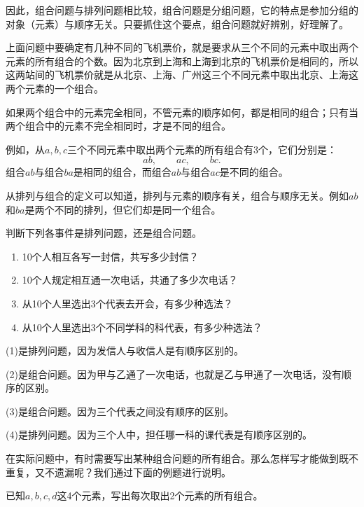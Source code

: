 因此，组合问题与排列问题相比较，组合问题是分组问题，它的特点是参加分组的对象（元素）与顺序无关。只要抓住这个要点，组合问题就好辨别，好理解了。

上面问题中要确定有几种不同的飞机票价，就是要求从三个不同的元素中取出两个元素的所有组合的个数。因为北京到上海和上海到北京的飞机票价是相同的，所以这两站间的飞机票价就是从北京、上海、广州这三个不同元素中取出北京、上海这两个元素的一个组合。

如果两个组合中的元素完全相同，不管元素的顺序如何，都是相同的组合；只有当两个组合中的元素不完全相同时，才是不同的组合。

例如，从$a,b,c$三个不同元素中取出两个元素的所有组合有3个，它们分别是：
\[ab,\qquad ac,\qquad bc.\]
组合$ab$与组合$ba$是相同的组合，而组合$ab$与组合$ac$是不同的组合。

从排列与组合的定义可以知道，排列与元素的顺序有关，组合与顺序无关。例如$ab$和$ba$是两个不同的排列，但它们却是同一个组合。

\begin{example}
    判断下列各事件是排列问题，还是组合问题。
\begin{enumerate}[(1)]
  \item 10个人相互各写一封信，共写多少封信？
 \item 10个人规定相互通一次电话，共通了多少次电话？
 \item 从10个人里选出3个代表去开会，有多少种选法？
 \item 从10个人里选出3个不同学科的科代表，有多少种选法？  
\end{enumerate}
\end{example}

\begin{solution}
(1)是排列问题，因为发信人与收信人是有顺序区别的。

(2)是组合问题。因为甲与乙通了一次电话，也就是乙与甲通了一次电话，没有顺序的区别。

(3)是组合问题。因为三个代表之间没有顺序的区别。

(4)是排列问题。因为三个人中，担任哪一科的课代表是有顺序区别的。
\end{solution}

在实际问题中，有时需要写出某种组合问题的所有组合。那么怎样写才能做到既不重复，又不遗漏呢？我们通过下面的例题进行说明。

\begin{example}
    已知$a,b,c,d$这4个元素，写出每次取出2个元素的所有组合。
\end{example}

